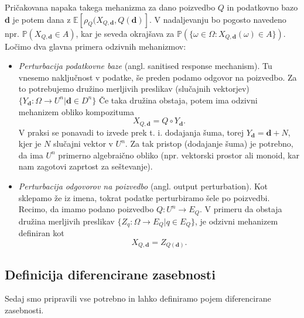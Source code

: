 \documentclass[12pt,a4paper]{amsart}
\theoremstyle{definition} %
\theoremstyle{plain} %
\begin{document}
Pričakovana napaka takega mehanizma za dano poizvedbo $Q$ in podatkovno bazo \textbf{d} je potem dana z $\mathbb{E}[\rho_{Q}(X_{Q,\textbf{d}},Q(\textbf{d})]$. 
V nadaljevanju bo pogosto navedeno npr. $\mathbb{P}(X_{Q,\textbf{d}} \in A)$, kar je seveda okrajšava za $\mathbb{P}(\{\omega \in \Omega : X_{Q,\textbf{d}}(\omega) \in A \})$.
\newline
\newline
Ločimo dva glavna primera odzivnih mehanizmov:
\begin{itemize}
\item \textit{Perturbacija podatkovne baze} (angl. sanitised response mechanism). Tu vnesemo naključnost v podatke, še preden podamo odgovor na poizvedbo. Za to potrebujemo družino merljivih preslikav (slučajnih vektorjev) $\{ Y_{\textbf{d}}: \Omega \rightarrow U^n | \textbf{d} \in D^n\}$ Če taka družina obstaja, potem ima odzivni mehanizem obliko kompozituma
\begin{equation}\label{odzivni2}
 X_{Q,\textbf{d}} = Q \circ Y_{\textbf{d}}. \tag{2}
\end{equation} 
V praksi se ponavadi to izvede prek t. i. dodajanja šuma, torej $Y_{\textbf{d}} = \textbf{d}+N$, kjer je $N$ slučajni vektor v $U^n$. Za tak pristop (dodajanje šuma) je potrebno, da ima $U^n$ primerno algebraično obliko (npr. vektorski prostor ali monoid, kar nam zagotovi zaprtost za seštevanje).
\item \textit{Perturbacija odgovorov na poizvedbo} (angl. output perturbation). Kot sklepamo že iz imena, tokrat podatke perturbiramo šele po poizvedbi. Recimo, da imamo podano poizvedbo $Q: U^n \rightarrow E_{Q}$. V primeru da obstaja družina merljivih preslikav $ \{Z_{q}:\Omega \rightarrow E_{Q} | q  \in E_{Q} \}$, je odzivni mehanizem definiran kot
\begin{equation}\label{odzivni3}
X_{Q,\textbf{d}}=Z_{Q(\textbf{d})}.\tag{3}
\end{equation} 
\end{itemize}

\subsection{Definicija diferencirane zasebnosti}
Sedaj smo pripravili vse potrebno in lahko definiramo pojem diferencirane zasebnosti.
\end{document}

